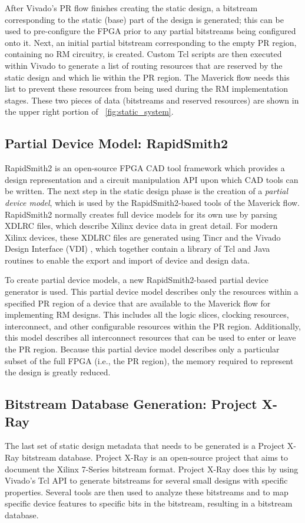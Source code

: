 After Vivado's PR flow finishes creating the static design, a bitstream corresponding to the static (base) part of the design is generated; this can be used to pre-configure the FPGA prior to any partial bitstreams being configured onto it.
Next, an initial partial bitstream corresponding to the empty PR region, containing no RM circuitry, is created.
Custom Tcl scripts are then executed within Vivado to generate a list of routing resources that are reserved by the static design and which lie within the PR region.
The Maverick flow needs this list to prevent these resources from being used during the RM implementation stages.
These two pieces of data (bitstreams and reserved resources) are shown in the upper right portion of \figurename~\ref{fig:static_system}.

\subsection{Partial Device Model: RapidSmith2}
RapidSmith2 \cite{Haroldsen:2015} is an open-source FPGA CAD tool framework which provides a design representation and a circuit manipulation API upon which CAD tools can be written. 
The next step in the static design phase is the creation of a {\em partial device model}, which is used by the RapidSmith2-based tools of the Maverick flow.
RapidSmith2 normally creates full device models for its own use by parsing XDLRC files, which describe Xilinx device data in great detail.
For modern Xilinx devices, these XDLRC files are generated using Tincr \cite{White:2014} and the Vivado Design Interface (VDI) \cite{Townsend:2017b}, which together contain a library of Tcl and Java routines to enable the export and import of device and design data.

To create partial device models, a new RapidSmith2-based partial device generator is used.
This partial device model describes only the resources within a specified PR region of a device that are available to the Maverick flow for implementing RM designs.
This includes all the logic slices, clocking resources, interconnect, and other configurable resources within the PR region.
Additionally, this model describes all interconnect resources that can be used to enter or leave the PR region.
Because this partial device model describes only a particular subset of the full FPGA (i.e., the PR region), the memory required to represent the design is greatly reduced.

\subsection{Bitstream Database Generation: Project X-Ray}
The last set of static design metadata that needs to be generated is a Project X-Ray \cite{PrjXray} bitstream database.
Project X-Ray is an open-source project that aims to document the Xilinx 7-Series bitstream format.
Project X-Ray does this by using Vivado's Tcl API to generate bitstreams for several small designs with specific properties.
Several tools are then used to analyze these bitstreams and to map specific device features to specific bits in the bitstream, resulting in a bitstream database.


